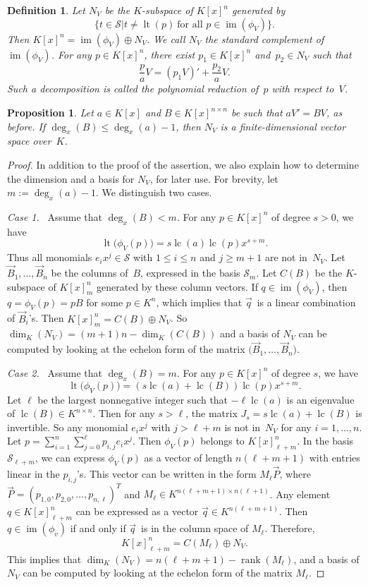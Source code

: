 \documentclass{sig-alternate}
\newtheorem{prop}[theorem]{Proposition}
\newtheorem{defi}[theorem]{Definition}
\newcommand{\cS}{ {\mathcal S}}
\def\lc{\operatorname{lc}}
\def\rank{\operatorname{rank}}
\def\lt{\operatorname{lt}}
\def\im{\operatorname{im}}
\begin{document}
\begin{defi}
Let $N_V$ be the $K$-subspace of $K[x]^n$ generated by
\[
  \bigl\{t \in \cS \mathrel{\big|} t \neq \lt(p) \ \text{for all $p\in \im(\phi_V)$}\bigr\}.
\]
Then $K[x]^n = \im(\phi_V) \oplus N_V$.
We call $N_V$ the \emph{standard complement} of $\im(\phi_V)$.
For any $p\in K[x]^n$, there exist $p_1\in K[x]^n$ and~$p_2\in N_V$ such that
\[\frac{p}{a}V = (p_1V)' + \frac{p_2}{a}V.\]
Such a decomposition is called the \emph{polynomial reduction} of~$p$
with respect to~$V$.
\end{defi}

\begin{prop}\label{PROP:finite}
Let $a\in K[x]$ and $B\in K[x]^{n \times n}$ be such that $aV'=BV$, as before.
If $\deg_x(B) \leq \deg_x(a)-1$, then $N_V$ is a finite-dimensional
vector space over~$K$.
\end{prop}
\begin{proof}
In addition to the proof of the assertion, we also explain how to determine
the dimension and a basis for $N_V$, for later use. For brevity, let
$m:=\deg_x(a)-1$. We distinguish two cases.

\smallskip
{\it Case 1.}~
Assume that $\deg_x(B) < m$. For any $p\in K[x]^n$ of degree $s>0$, we have
\[
  \lt\bigl(\phi_V(p)\bigr) = s\lc(a)\lc(p)x^{s+m}.
\]
Thus all monomials $e_i x^j\in \cS$ with $1\leq i\leq n$ and $j\geq m+1$ are not in~$N_V$.
Let $\vec{B}_1, \ldots, \vec{B}_n$ be the columns of~$B$, expressed in the basis $\cS_m$.
Let $C(B)$ be the $K$-subspace of $K[x]_m^n$ generated by these column vectors.
If $q\in \im(\phi_V)$, then $q = \phi_V(p) = pB$ for some $p \in K^n$, which implies that
$\vec{q}\,$ is a linear combination of $\vec{B}_i$'s. Then $K[x]_m^n = C(B) \oplus N_V$.
So $\dim_K(N_V)= (m+1)n - \dim_K(C(B))$ and a basis of $N_V$ can be computed by
looking at the echelon form of the matrix $\bigl(\vec{B}_1, \ldots, \vec{B}_n\bigr)$.

\smallskip
{\it Case 2.}~
Assume that $\deg_x(B) =m$. For any $p\in K[x]^n$ of degree $s$, we have
\[
  \lt\bigl(\phi_V(p)\bigr) = (s\lc(a) + \lc(B))\lc(p)x^{s+m}.
\]
Let $\ell$ be the largest nonnegative integer such that $-\ell \lc(a)$ is an
eigenvalue of $\lc(B)\in K^{n\times n}$. Then for any $s>\ell$,
the matrix $J_s = s\lc(a) + \lc(B)$ is invertible. So any monomial $e_ix^j$ with $j> \ell+m$ is not in~$N_V$
for any $i=1, \ldots, n$. Let $p = \sum_{i=1}^n \sum_{j=0}^{\ell} p_{i, j} e_ix^j$.
Then $\phi_V(p)$ belongs to $K[x]_{\ell+m}^n$.
In the basis $\cS_{\ell+m}$, we can
express $\phi_V(p)$ as a vector of length ${n(\ell+m+1)}$ with entries linear in the $p_{i, j}$'s.
This vector can be written in the form $M_{\ell} \vec{P}$,
where $\vec{P} = (p_{1, 0}, p_{2, 0}, \ldots, p_{n, \ell})^T$ and $M_{\ell} \in K^{n(\ell+m +1) \times n(\ell+1)}$.
Any element $q\in K[x]_{\ell+m}^n$ can be expressed as a vector $\vec{q} \in K^{n(\ell + m +1)}$.
Then $q\in\im(\phi_v)$ if and only if $\vec{q}\,$ is in the column space of $M_{\ell}$.
Therefore,
\[K[x]_{\ell+m}^n = C({M_{\ell}}) \oplus N_V. \]
This implies that $\dim_K(N_V) = n(\ell+m+1) - \rank({M_{\ell}})$, and
a basis of $N_V$ can be computed by
looking at the echelon form of the matrix ${M_{\ell}}$.
\end{proof}
\end{document}
